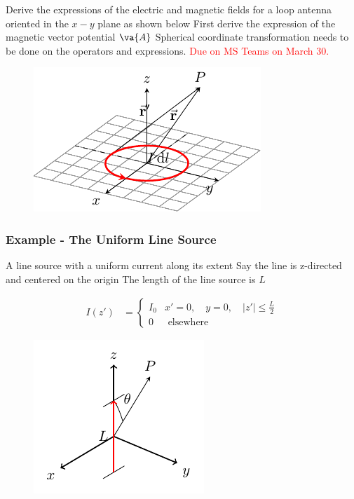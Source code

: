 \documentclass[10pt, compress]{beamer}
\begin{document}
\begin{frame}
  
  \begin{tcolorbox}[colback=blue!5,colframe=university-blue,title=Homework]
  \begin{outline}
    \1 Derive the expressions of the electric and magnetic fields for a loop antenna oriented in the $x-y$ plane as shown below
    \2 First derive the expression of the magnetic vector potential $\va{A}$
    \2 Spherical coordinate transformation needs to be done on the operators and expressions.
    \1 \textcolor{red}{Due on MS Teams on March 30.}
  \end{outline}
\end{tcolorbox}
\begin{figure}
  \centering
  \includegraphics[width=.4\textwidth]{circular.pdf}
\end{figure}
\end{frame}

\begin{frame}
  \frametitle{Example - The Uniform Line Source}
  \begin{outline}
    \1 A line source with a uniform current along its extent
    \1 Say the line is z-directed and centered on the origin
    \1 The length of the line source is $L$
  \end{outline}
  \begin{align*}
    I (z') &=\left\{\begin{array}{ll}
I_{0} & x'=0, \quad y=0, \quad |z'| \leq \frac{L}{2} \\
0 & \text { elsewhere }
\end{array}\right.
  \end{align*}
  \begin{figure}[t!]
  \centering
  \includegraphics[width=.4\textwidth]{line_source.pdf}
\end{figure}
\end{frame}
\end{document}
